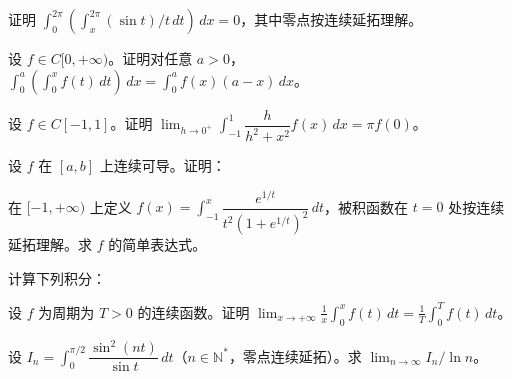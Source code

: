 \noindent\begin{minipage}{\textwidth}
证明 $\int_0^{2\pi}(\int_x^{2\pi}(\sin t)/t\,dt)\,dx=0$，其中零点按连续延拓理解。
\end{minipage}\par\vfill
\newpage
\noindent\begin{minipage}{\textwidth}
设 $f\in C[0,+\infty)$。证明对任意 $a>0$，$\int_0^a(\int_0^x f(t)\,dt)\,dx=\int_0^a f(x)(a-x)\,dx$。
\end{minipage}\par\vfill
\noindent\begin{minipage}{\textwidth}
设 $f\in C[-1,1]$。证明 $\lim_{h\to0^+}\int_{-1}^1\dfrac h{h^2+x^2}f(x)\,dx=\pi f(0)$。
\end{minipage}\par\vfill
\noindent\begin{minipage}{\textwidth}
设 $f$ 在 $[a,b]$ 上连续可导。证明：
\end{minipage}\par\vfill
\newpage
\noindent\begin{minipage}{\textwidth}
在 $[-1,+\infty)$ 上定义 $f(x)=\int_{-1}^x\dfrac{e^{1/t}}{t^2(1+e^{1/t})^2}\,dt$，被积函数在 $t=0$ 处按连续延拓理解。求 $f$ 的简单表达式。
\end{minipage}\par\vfill
\noindent\begin{minipage}{\textwidth}
计算下列积分：
\end{minipage}\par\vfill
\noindent\begin{minipage}{\textwidth}
设 $f$ 为周期为 $T>0$ 的连续函数。证明 $\lim_{x\to+\infty}\frac1x\int_0^x f(t)\,dt=\frac1T\int_0^T f(t)\,dt$。
\end{minipage}\par\vfill
\newpage
\noindent\begin{minipage}{\textwidth}
设 $I_n=\int_0^{\pi/2}\dfrac{\sin^2(nt)}{\sin t}\,dt$（$n\in\mathbb N^*$，零点连续延拓）。求 $\lim_{n\to\infty}I_n/\ln n$。
\end{minipage}\par\vfill
